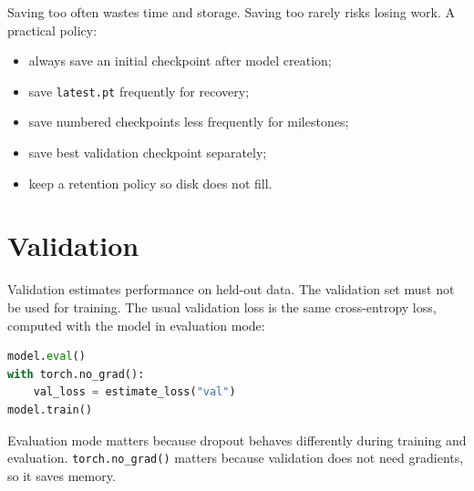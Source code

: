 Saving too often wastes time and storage. Saving too rarely risks losing work. A practical policy:

\begin{itemize}
  \item always save an initial checkpoint after model creation;
  \item save \texttt{latest.pt} frequently for recovery;
  \item save numbered checkpoints less frequently for milestones;
  \item save best validation checkpoint separately;
  \item keep a retention policy so disk does not fill.
\end{itemize}

\begin{center}
\end{center}

\section{Validation}

Validation estimates performance on held-out data. The validation set must not be used for training. The usual validation loss is the same cross-entropy loss, computed with the model in evaluation mode:

\begin{lstlisting}[language=Python]
model.eval()
with torch.no_grad():
    val_loss = estimate_loss("val")
model.train()
\end{lstlisting}

Evaluation mode matters because dropout behaves differently during training and evaluation. \texttt{torch.no\_grad()} matters because validation does not need gradients, so it saves memory.

